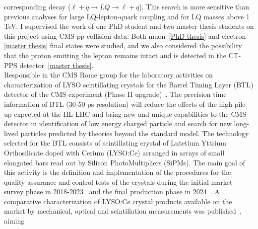 \documentclass[10pt, a4paper]{article}
\newcommand{\years}[1]{\marginnote{\hskip-0.2in{\scriptsize #1}}}
\begin{document}
corresponding decay ($\ell+q\rightarrow LQ \rightarrow \ell+q$). This
search is more sensitive than previous analyses for large
LQ-lepton-quark coupling and for LQ masses above 1 TeV.
I supervised the work of one PhD student and two master thesis
students on this project using CMS pp collision data. Both muon~\href{https://www.roma1.infn.it/exp/cms/tesiPHD/index.html}{[PhD
  thesis]}\cite{AN-23-093} and electron
\href{https://www.roma1.infn.it/exp/cms/tesi/tesi_laurea_completate/foglietti.pdf}{[master
  thesis]} final states were studied, and we also considered the
possibility that the proton emitting the lepton remains intact and is
detected in the CT-PPS detector~\href{https://www.roma1.infn.it/exp/cms/tesi/tesi_laurea_completate/akrap.pdf}{[master
  thesis]}. \\ [1em] 
\years{09/2017 - today}Responsible in the CMS Rome group for
the laboratory activities on characterization of LYSO scintillating
crystals for the Barrel Timing Layer (BTL) detector of the CMS experiment
(Phase II upgrade)~\cite{CMS-TDR-020}. The precision time information
of BTL (30-50 ps
resolution) will reduce the effects of the high pile-up expected at
the HL-LHC and bring new and unique capabilities to the CMS detector 
in identification of low energy charged particle and search for
new long-lived particles predicted by theories beyond the standard model.
The technology selected for the BTL consists of scintillating crystal of
Lutetium Yttrium Orthosilicate doped with Cerium (LYSO:Ce) arranged in 
arrays of small elongated bars read out by Silicon PhotoMultipliers
(SiPMs). The main goal of this activity is the definition and implementation 
of the procedures for the quality assurance and control tests of the
crystals during the initial market survey phase in
2018-2023~\cite{DN-20-010,DN-21-014} and the 
final production phase in 2024~\cite{DP-24-077}. A comparative
characterization of LYSO:Ce crystal products available on the market
by mechanical, optical and scintillation measurements was published~\cite{Addesa:2022qlt}, aiming
\end{document}
